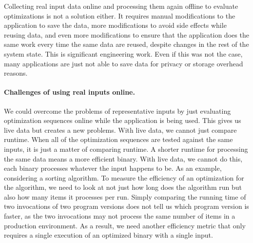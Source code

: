     Collecting real input data online and processing them again offline to evaluate optimizations is not a solution either. It requires
    manual modifications to the application to save the data, more modifications to avoid side effects while reusing data, and even more
    modifications to ensure that the application does the same work every time the same data are reused, despite changes in the rest of
    the system state. 
    This is significant engineering work. Even if this was not the case, many applications are just not able to save
    data for privacy or storage overhead reasons.


    \paragraph{Challenges of using real inputs online.} We could overcome the problems of representative inputs by just evaluating
    optimization sequences online while the application is being used.
    This gives us live data but creates a new problems.
    With live data, we cannot just compare runtime.
    When all of the optimization sequences are tested against the same inputs, it is just a matter of comparing runtime.
    A shorter runtime for processing the same data means a more efficient binary.
    With live data, we cannot do this, each binary processes
    whatever the input happens to be.
    As an example, considering a sorting algorithm. To measure the efficiency of an optimization for the algorithm, we need to look at not just
    how long does the algorithm run but also how many items it processes per run. Simply comparing the running time of two invocations of two program versions does not
    tell us which program version is faster, as the two invocations may not process the same number of items in a production environment. As a result, we need another efficiency metric
    that only requires a single execution of an optimized binary with a single input.


